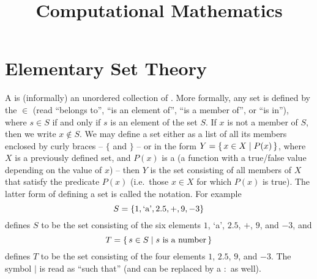 \title{\textbf{Computational Mathematics}}

\date{}
\maketitle

\begingroup
\let\clearpage\relax
\tableofcontents
\endgroup

\clearpage

\renewcommand{\nomname}{List of Symbols}
\printnomenclature[10em]

\clearpage

\section{Elementary Set Theory}\label{sec:SetTheory}

A  is (informally) an unordered collection of . More formally, any set is defined by the  $\in$ (read ``belongs to'', ``is an element of'', ``is a member of'', or ``is in''), where $s \in S$ if and only if $s$ is an element of the set $S$. If $x$ is not a member of $S$, then we write $x \notin S$. We may define a set either as a list of all its members enclosed by curly braces -- $\{$ and $\}$ -- or in the form $Y = \qty{\, x \in X \mid P(x) \,}$, where $X$ is a previously defined set, and $P(x)$ is a  (a function with a true/false value depending on the value of $x$) -- then $Y$ is the set consisting of all members of $X$ that satisfy the predicate $P(x)$ (i.e.\ those $x \in X$ for which $P(x)$ is true). The latter form of defining a set is called the  notation. For example
\begin{equation*}
S = \qty{1, \text{`a'}, 2.5, +, 9, -3}
\end{equation*}
defines $S$ to be the set consisting of the six elements $1$, `a', $2.5$, $+$, $9$, and $-3$, and
\begin{equation*}
T = \qty{\, s \in S \mid s\ \text{is a number} \,}
\end{equation*}
defines $T$ to be the set consisting of the four elements $1$, $2.5$, $9$, and $-3$. The symbol {$|$} is read as ``such that'' (and can be replaced by a $:$ as well).

